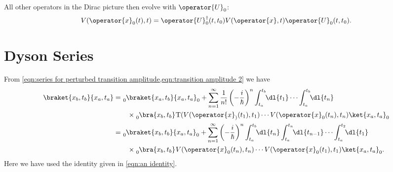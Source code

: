 \documentclass[fleqn]{NotesClass}
\newcommand*{\hermit}{\dagger}
\newcommand*{\timeorder}{\mathrm{T}}
\begin{document}
    All other operators in the Dirac picture then evolve with \(\operator{U}_0\):
    \begin{equation}
        V(\operator{x}_0(t), t) = \operator{U}_0^\hermit (t, t_0) V(\operator{x}, t)\operator{U}_0(t, t_0).
    \end{equation}
    
    \section{Dyson Series}
    From \cref{eqn:series for perturbed transition amplitude,eqn:transition amplitude 2} we have
    \begin{align}
        \braket{x_b, t_b}{x_a, t_a} &= \tensor[_0]{\braket{x_a, t_b}{x_a, t_a}}{_0} + \sum_{n=1}^{\infty} \frac{1}{n!} \left( -\frac{i}{\hbar} \right)^n \int_{t_a}^{t_b} \!\! \dl{t_1} \dotsm \int_{t_a}^{t_b} \!\! \dl{t_n}\notag\\
        &\qquad\times \tensor[_0]{\bra{x_b, t_b}}{} \timeorder(V(\operator{x}_)(t_1), t_1) \dotsm V(\operator{x}_0(t_n), t_n) \ket{x_a, t_a}_0\\
        &= \tensor[_0]{\braket{x_b, t_b}{x_a, t_a}}{_0} + \sum_{n=1}^{\infty} \left( -\frac{i}{\hbar} \right)^{n} \int_{t_a}^{t_b} \!\! \dl{t_n} \int_{t_a}^{t_n} \!\! \dl{t_{n-1}} \dotsm \int_{t_a}^{t_2} \!\! \dl{t_1} \notag\\
        &\qquad\times \tensor[_0]{\bra{x_b, t_b}}{} V(\operator{x}_0(t_n), t_n) \dotsm V(\operator{x}_0(t_1), t_1)\ket{x_a, t_a}_0.
    \end{align}
    Here we have used the identity given in \cref{eqn:an identity}.
    
\end{document}

